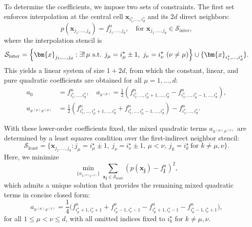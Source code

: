 \documentclass{article}
\theoremstyle{plain}
\theoremstyle{definition}
\theoremstyle{remark}
\begin{document}
To determine the coefficients, we impose two sets of constraints. The first set enforces interpolation at the central cell \(\bm{x}_{i^\star_1,\ldots,i^\star_d}\) and its \(2d\) direct neighbors:
\begin{equation*}
    p(\bm{x}_{j_1,\ldots,j_d}) = f^n_{j_1,\ldots,j_d}, \quad \text{for } \bm{x}_{j_1,\ldots,j_d} \in \mathcal{S}_{\mathrm{inter}},
\end{equation*}
where the interpolation stencil is
\begin{equation*}
\mathcal{S}_{\mathrm{inter}}
= \Bigl\{ \bm{x}_{j_1,\ldots,j_d} :
\exists!\,\mu \ \text{s.t. } j_\mu=i^\star_\mu\pm 1, \ 
j_\nu=i^\star_\nu \ (\nu\neq\mu) \Bigr\}
\cup \{\bm{x}_{i^\star_1,\ldots,i^\star_d}\}.
\end{equation*}
This yields a linear system of size \(1 + 2d\), from which the constant, linear, and pure quadratic coefficients are obtained for all \( \mu = 1,\ldots,d \):
\begin{align*}
    a_0 &= f^n_{i^\star_1,\ldots,i^\star_d}, \quad a_{x^{(\mu)}} = \frac{1}{2} \left( f^n_{i^\star_1,\ldots,i^\star_\mu+1,\ldots,i^\star_d} - f^n_{i^\star_1,\ldots,i^\star_\mu-1,\ldots,i^\star_d} \right), \\
    a_{x^{(\mu)}x^{(\mu)}} &= \frac{1}{2} \left( f^n_{i^\star_1,\ldots,i^\star_\mu+1,\ldots,i^\star_d} + f^n_{i^\star_1,\ldots,i^\star_\mu-1,\ldots,i^\star_d} \right) - f^n_{i^\star_1,\ldots,i^\star_d}.
\end{align*}

With these lower-order coefficients fixed, the mixed quadratic terms \( a_{x^{(\mu)}x^{(\nu)}} \) are determined by a least squares condition over the first-indirect neighbor stencil:
\begin{equation*}
    \mathcal{S}_{\mathrm{least}} = \bigl\{ \bm{x}_{j_1,\ldots,j_d} : j_\mu = i^\star_\mu \pm 1,\ j_\nu = i^\star_\nu \pm 1,\ \mu < \nu,\ j_k = i_k^\star\ \text{for } k \ne \mu,\nu \bigr\}.
\end{equation*}
Here, we minimize
\vspace{-0.3cm}
\begin{equation*}
    \min_{\{a_{x^{(\mu)}x^{(\nu)}}\}} \sum_{\bm{x}_{\bm{j}} \in \mathcal{S}_{\mathrm{least}}} \left( p(\bm{x}_{\bm{j}}) - f^n_{\bm{j}} \right)^2,
\end{equation*}
\vspace{-0.1cm}
which admits a unique solution that provides the remaining mixed quadratic terms in concise closed form:
\begin{equation*}
    a_{x^{(\mu)}x^{(\nu)}} = \frac{1}{4} \big( f^n_{i^\star_\mu+1, i^\star_\nu+1} + f^n_{i^\star_\mu-1, i^\star_\nu-1} - f^n_{i^\star_\mu+1, i^\star_\nu-1} - f^n_{i^\star_\mu-1, i^\star_\nu+1} \big),
\end{equation*}
for all \( 1 \leq \mu < \nu \leq d \), with all omitted indices fixed to \( i^\star_k \) for \( k \ne \mu,\nu \).
\end{document}
